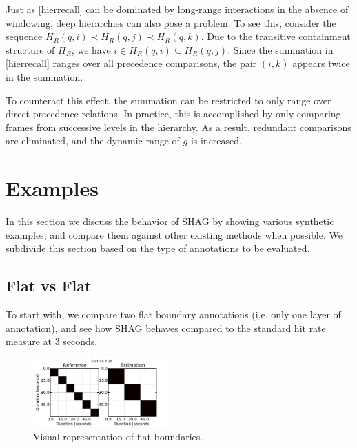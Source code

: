 \documentclass{article}
\begin{document}
Just as \cref{hierrecall} can be dominated by long-range interactions in the absence
of windowing, deep hierarchies can also pose a problem.  To see this, consider the 
sequence $H_R(q, i) \prec H_R(q, j) \prec H_R(q, k)$.  Due to the transitive
containment structure of $H_R$, we have $i \in H_R(q, i) \subseteq H_R(q, j)$.
Since the summation in \cref{hierrecall} ranges over all precedence comparisons, the
pair $(i, k)$ appears twice in the summation.  

To counteract this effect, the summation can be restricted to only range over direct
precedence relations.  In practice, this is accomplished by only comparing frames from
successive levels in the hierarchy.  As a result, redundant comparisons are
eliminated, and the dynamic range of $g$ is increased.

\section{Examples}\label{sec:using_method}

In this section we discuss the behavior of SHAG by showing various synthetic examples, and compare them against other existing methods when possible.
We subdivide this section based on the type of annotations to be evaluated.

\subsection{Flat vs Flat}

To start with, we compare two flat boundary annotations (i.e. only one layer of annotation), and see how SHAG behaves compared to the standard hit rate measure at 3 seconds.

\begin{figure}
  \centering
  \includegraphics[width=0.47\textwidth]{plots/flat-flat.pdf}
  \caption{Visual representation of flat boundaries.}
  \label{fig:flat-flat}
\end{figure}%
\end{document}
